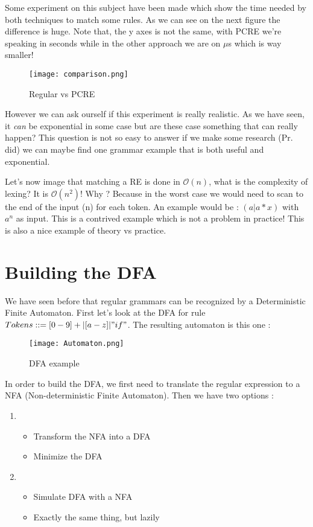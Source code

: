     \newpage
    Some experiment on this subject have been made which show the time needed by
    both techniques to match some rules. As we can see on the next figure the
    difference is huge. Note that, the y axes is not the same, with PCRE we're
    speaking in seconds while in the other approach we are on $\mu$s which is
    way smaller!
    \begin{figure}[H]
         \centering
         \texttt{[image: comparison.png]}
         \caption{Regular vs PCRE}
         \label{fig:regu_vs_pcre}
    \end{figure}

    However we can ask ourself if this experiment is really realistic. As we
    have seen, it \textit{can} be exponential in some case but are these case
    something that can really happen? This question is not so easy to answer if
    we make some research (Pr. did) we can maybe find one grammar example that
    is both useful and exponential.

    Let's now image that matching a RE is done in $\mathcal{O}(n)$, what is the
    complexity of lexing? It is $\mathcal{O}(n^2)$! Why ? Because in the worst
    case we would need to scan to the end of the input (n) for each token. An
    example would be : $(a | a*x)$ with $a^n$ as input. This is a contrived
    example which is not a problem in practice! This is also a nice example of
    theory vs practice.

\section{Building the DFA}
    We have seen before that regular grammars can be recognized by a
    Deterministic Finite Automaton. First let's look at the DFA for rule $Tokens
    ::= [0-9]+ | [a-z] | "if"$. The resulting automaton is this one :
    \begin{figure}[H]
         \centering
         \texttt{[image: Automaton.png]}
         \caption{DFA example}
         \label{fig:dfa_ex}
    \end{figure}

    In order to build the DFA, we first need to translate the regular expression
    to a NFA (Non-deterministic Finite Automaton). Then we have two options :
    \begin{enumerate}
        \item \begin{itemize}
            \item Transform the NFA into a DFA
            \item Minimize the DFA
        \end{itemize}
        \item \begin{itemize}
            \item Simulate DFA with a NFA
            \item Exactly the same thing, but lazily
        \end{itemize}
    \end{enumerate}
\newpage
